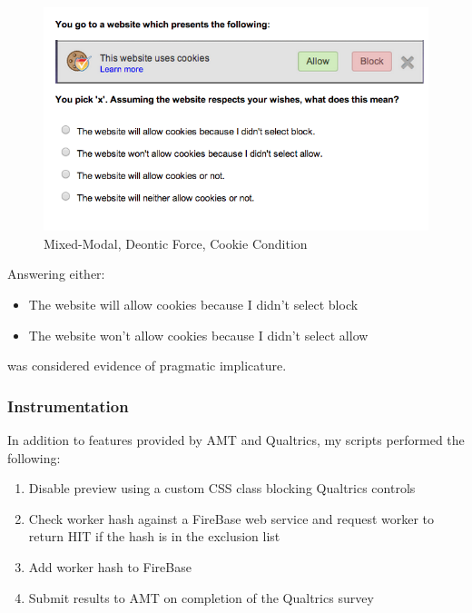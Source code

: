 \begin{figure}
\centerline{
  \includegraphics[scale=.5]{chapter5.tex/dialogcpcookie}
  }
\caption{Mixed-Modal, Deontic Force, Cookie Condition}
\label{dialogcpcookie}
\end{figure}


Answering either:

\begin{itemize}
\item The website will allow cookies because I didn't select block
\item The website won't allow cookies because I didn't select allow
\end{itemize}

was considered evidence of pragmatic implicature. 

\subsubsection{Instrumentation}
\label{instrumentation}


\begin{sloppier}
In addition to features provided by AMT and Qualtrics, my scripts performed the following:

\begin{enumerate}
\item Disable preview using a custom CSS class blocking Qualtrics controls
\item Check worker hash against a FireBase web service and request worker to return HIT if the hash is in the exclusion list
\item Add worker hash to FireBase
\item Submit results to AMT on completion of the Qualtrics survey
\end{enumerate}
\end{sloppier}


